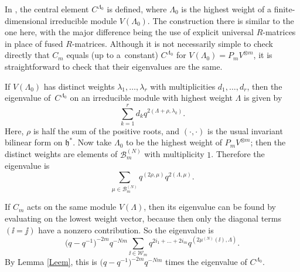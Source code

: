 \begin{Remark}\label{Remark1}
In \cite{ZGBJPhysA}, the central element $C^{\Lambda_0}$ is defined, where $\Lambda_0$ is the highest weight of a finite-dimensional irreducible module $V(\Lambda_0)$. The construction there is similar to the one here, with the major difference being the use of explicit universal $R$-matrices in place of fused $R$-matrices. Although it is not necessarily simple to check directly that $C_m$ equals (up to a~constant) $C^{\Lambda_0}$ for $V(\Lambda_0)=P_mV^{\otimes m}$, it is straightforward to check that their eigenvalues are the same.

If $V(\Lambda_0)$ has distinct weights $\lambda_1,\dots,\lambda_r$ with multiplicities $d_1,\dots,d_r$, then the eigenvalue of~$C^{\Lambda_0}$ on an irreducible module with highest weight $\Lambda$ is given by
\[
\sum_{k=1}^r d_k q^{2(\Lambda + \rho,\lambda_k)}.
\]
Here, $\rho$ is half the sum of the positive roots, and $(\cdot,\cdot)$ is the usual invariant bilinear form on $\mathfrak{h}^*$. Now take $\Lambda_0$ to be the highest weight of $P_mV^{\otimes m}$; then the distinct weights are elements of $\mathcal{B}^{(N)}_m$ with multiplicity $1$. Therefore the eigenvalue is
\[
\sum_{\mu \in \mathcal{B}^{(N)}_m} q^{(2\rho,\mu)}q^{2(\Lambda,\mu)}.
\]

If $C_m$ acts on the same module $V(\Lambda)$, then its eigenvalue can be found by evaluating on the lowest weight vector, because then only the diagonal terms $(\ii=\jj)$ have a nonzero contribution. So the eigenvalue is
\[
\big(q-q^{-1}\big)^{-2m}q^{-Nm}\sum_{\ii \in \mathcal{W}_m} q^{ 2i_1 + \dots + 2i_m} q^{(2\mu^{(N)}(\ii),\Lambda)}.
\]
By Lemma \ref{Leem}, this is $\big(q-q^{-1}\big)^{-2m}q^{-Nm}$ times the eigenvalue of $C^{\Lambda_0}$.
\end{Remark}
